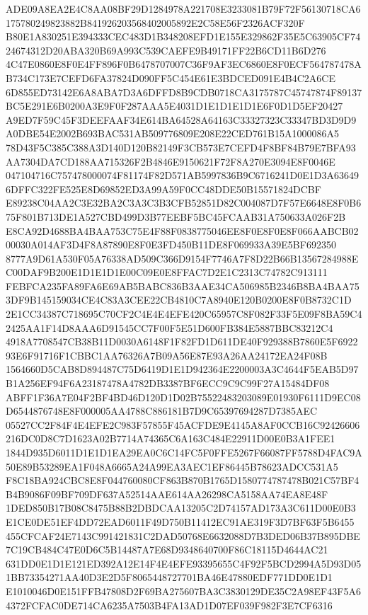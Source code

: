 \documentclass[UTF8,fontset=fandol,zihao=-4,a4paper]{ctexart}
\begin{document}
{{ADE09A8EA2E4C8AA08BF29D1284978A221708E3233081B79F72F56130718CA6175780249823882B841926203568402005892E2C58E56F2326ACF320F
B80E1A830251E394333CEC483D1B348208EFD1E155E329862F35E5C63905CF7424674312D20ABA320B69A993C539CAEFE9B49171FF22B6CD11B6D276
4C47E0860E8F0E4FF896F0B6478707007C36F9AF3EC6860E8F0ECF564787478AB734C173E7CEFD6FA37824D090FF5C454E61E3BDCED091E4B4C2A6CE
6D855ED73142E6A8ABA7D3A6DFFD8B9CDB0718CA3175787C45747874F89137BC5E291E6B0200A3E9F0F287AAA5E4031D1E1D1E1D1E6F0D1D5EF20427
A9ED7F59C45F3DEEFAAF34E614BA64528A64163C33327323C33347BD3D9D9A0DBE54E2002B693BAC531AB509776809E208E22CED761B15A1000086A5
78D43F5C385C388A3D140D120B82149F3CB573E7CEFD4F8BF84B79E7BFA93AA7304DA7CD188AA715326F2B4846E9150621F72F8A270E3094E8F0046E
047104716C757478000074F81174F82D571AB5997836B9C6716241D0E1D3A636496DFFC322FE525E8D69852ED3A99A59F0CC48DDE50B15571824DCBF
E89238C04AA2C3E32BA2C3A3C3B3CFB52851D82C004087D7F57E6648E8F0B675F801B713DE1A527CBD499D3B77EEBF5BC45FCAAB31A750633A026F2B
E8CA92D4688BA4BAA753C75E4F88F0838775046EE8F0E8F0E8F066AABCB0200030A014AF3D4F8A87890E8F0E3FD450B11DE8F069933A39E5BF692350
8777A9D61A530F05A76338AD509C366D9154F7746A7F8D22B66B13567284988EC00DAF9B200E1D1E1D1E00C09E0E8FFAC7D2E1C2313C74782C913111
FEBFCA235FA89FA6E69AB5BABC836B3AAE34CA506985B2346B8BA4BAA753DF9B145159034CE4C83A3CEE22CB4810C7A8940E120B0200E8F0B8732C1D
2E1CC34387C718695C70CF2C4E4E4EFE420C65957C8F082F33F5E09F8BA59C42425AA1F14D8AAA6D91545CC7F00F5E51D600FB384E5887BBC83212C4
4918A7708547CB38B11D0030A6148F1F82FD1D611DE40F929388B7860E5F692293E6F91716F1CBBC1AA76326A7B09A56E87E93A26AA24172EA24F08B
1564660D5CAB8D894487C75D6419D1E1D942364E2200003A3C4644F5EAB5D97B1A256EF94F6A23187478A4782DB3387BF6ECC9C9C99F27A15484DF08
ABFF1F36A7E04F2BF4BD46D120D1D02B75522483203089E01930F6111D9EC08D6544876748E8F000005AA4788C886181B7D9C65397694287D7385AEC
05527CC2F84F4E4EFE2C983F57855F45ACFDE9E4145A8AF0CCB16C92426606216DC0D8C7D1623A02B7714A74365C6A163C484E22911D00E0B3A1FEE1
1844D935D6011D1E1D1EA29EA0C6C14FC5F0FFE5267F66087FF5788D4FAC9A50E89B53289EA1F048A6665A24A99EA3AEC1EF86445B78623ADCC531A5
F8C18BA924CBC8E8F044760080CF863B870B1765D1580774787478B021C57BF4B4B9086F09BF709DF637A52514AAE614AA26298CA5158AA74EA8E48F
1DED850B17B08C8475B88B2DBDCAA13205C2D74157AD173A3C611D00E0B3E1CE0DE51EF4DD72EAD6011F49D750B11412EC91AE319F3D7BF63F5B6455
455CFCAF24E7143C991421831C2DAD50768E6632088D7B3DED06B37B895DBE7C19CB484C47E0D6C5B14487A7E68D9348640700F86C18115D4644AC21
631DD0E1D1E121ED392A12E14F4E4EFE93395655C4F92F5BCD2994A5D93D051BB73354271AA40D3E2D5F8065448727701BA46E47880EDF771DD0E1D1
E1010046D0E151FFB47808D2F69BA275607BA3C3830129DE35C2A98EF43F5A64372FCFAC0DE714CA6235A7503B4FA13AD1D07EF039F982F3E7CF6316
}}
\end{document}
